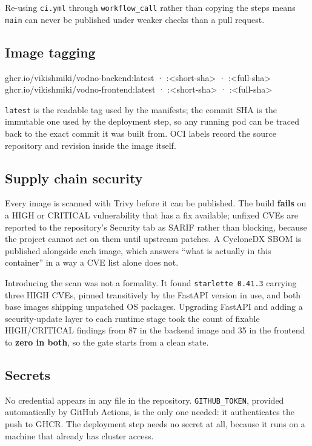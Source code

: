 \documentclass[10pt,a4paper]{article}
\newcommand{\cd}[1]{\texttt{\small #1}}
\begin{document}
Re-using \cd{ci.yml} through \cd{workflow\_call} rather than copying the steps
means \cd{main} can never be published under weaker checks than a pull
request.

\subsection{Image tagging}

\begin{code}
ghcr.io/vikishmiki/vodno-backend:latest · :<short-sha> · :<full-sha>
ghcr.io/vikishmiki/vodno-frontend:latest · :<short-sha> · :<full-sha>
\end{code}

\cd{latest} is the readable tag used by the manifests; the commit SHA is the
immutable one used by the deployment step, so any running pod can be traced
back to the exact commit it was built from. OCI labels record the source
repository and revision inside the image itself.

\subsection{Supply chain security}

Every image is scanned with Trivy before it can be published. The build
\textbf{fails} on a HIGH or CRITICAL vulnerability that has a fix available;
unfixed CVEs are reported to the repository's Security tab as SARIF rather
than blocking, because the project cannot act on them until upstream patches.
A CycloneDX SBOM is published alongside each image, which answers ``what is
actually in this container'' in a way a CVE list alone does not.

Introducing the scan was not a formality. It found \cd{starlette 0.41.3}
carrying three HIGH CVEs, pinned transitively by the FastAPI version in use,
and both base images shipping unpatched OS packages. Upgrading FastAPI and
adding a security-update layer to each runtime stage took the count of
fixable HIGH/CRITICAL findings from 87 in the backend image and 35 in the
frontend to \textbf{zero in both}, so the gate starts from a clean state.

\subsection{Secrets}

No credential appears in any file in the repository. \cd{GITHUB\_TOKEN},
provided automatically by GitHub Actions, is the only one needed: it
authenticates the push to GHCR. The deployment step needs no secret at all,
because it runs on a machine that already has cluster access.
\end{document}
